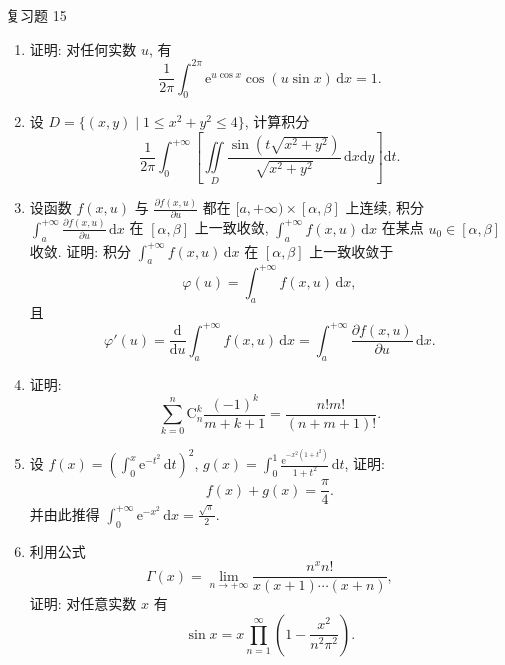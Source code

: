
\begin{exblock}{复习题 15}
\begin{enumerate}
  \item 证明: 对任何实数 $u$, 有
  \[
    \frac{1}{2\pi}\int_{0}^{2\pi}\mathrm{e}^{u\cos x}\cos(u\sin x)\,\mathrm{d}x=1.
\]

  \item 设 $D=\{(x,y)\mid 1\leqslant x^{2}+y^{2}\leqslant 4\}$, 计算积分
  \[
    \frac{1}{2\pi}\int_{0}^{+\infty}\left[\iint\limits_{D}\frac{\sin(t\sqrt{x^{2}+y^{2}})}{\sqrt{x^{2}+y^{2}}}\,\mathrm{d}x\mathrm{d}y\right]\mathrm{d}t.
\]

  \item 设函数 $f(x,u)$ 与 $\displaystyle\frac{\partial f(x,u)}{\partial u}$ 都在 $[a,+\infty)\times[\alpha,\beta]$ 上连续, 积分 $\displaystyle\int_{a}^{+\infty}\frac{\partial f(x,u)}{\partial u}\,\mathrm{d}x$ 在 $[\alpha,\beta]$ 上一致收敛, $\displaystyle\int_{a}^{+\infty}f(x,u)\,\mathrm{d}x$ 在某点 $u_{0}\in[\alpha,\beta]$ 收敛. 证明: 积分 $\displaystyle\int_{a}^{+\infty}f(x,u)\,\mathrm{d}x$ 在 $[\alpha,\beta]$ 上一致收敛于
  \[
    \varphi(u)=\int_{a}^{+\infty}f(x,u)\,\mathrm{d}x,
\]
  且
  \[
    \varphi'(u)=\frac{\mathrm{d}}{\mathrm{d}u}\int_{a}^{+\infty}f(x,u)\,\mathrm{d}x=\int_{a}^{+\infty}\frac{\partial f(x,u)}{\partial u}\,\mathrm{d}x.
\]

  \item 证明:
  \[
    \sum_{k=0}^{n}\mathrm{C}_{n}^{k}\frac{(-1)^{k}}{m+k+1}=\frac{n!m!}{(n+m+1)!}.
\]

  \item 设 $\displaystyle f(x)=\left(\int_{0}^{x}\mathrm{e}^{-t^{2}}\,\mathrm{d}t\right)^{2}$, $\displaystyle g(x)=\int_{0}^{1}\frac{\mathrm{e}^{-x^{2}(1+t^{2})}}{1+t^{2}}\,\mathrm{d}t$, 证明:
  \[
    f(x)+g(x)=\frac{\pi}{4}.
\]
  并由此推得 $\displaystyle\int_{0}^{+\infty}\mathrm{e}^{-x^{2}}\,\mathrm{d}x=\frac{\sqrt{\pi}}{2}$.

  \item 利用公式
  \[
    \Gamma(x)=\lim_{n\to+\infty}\frac{n^{x}n!}{x(x+1)\cdots(x+n)},
\]
  证明: 对任意实数 $x$ 有
  \[
    \sin x=x\prod_{n=1}^{\infty}\left(1-\frac{x^{2}}{n^{2}\pi^{2}}\right).
\]


\end{enumerate}
\end{exblock}
